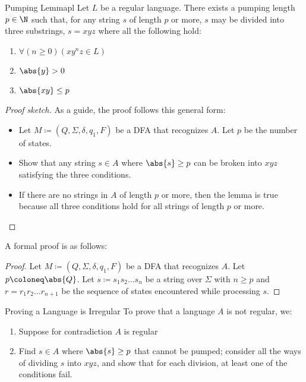 \documentclass[12pt]{report}
\begin{document}
\begin{thmbox}{Pumping Lemma}{pl}
    Let $L$ be a regular language. There exists a pumping length $p \in \N$ such that, for any string $s$ of length $p$ or more, $s$ may be divided into three substrings, $s = x y z$ where all the following hold:
    \begin{enumerate}[noitemsep]
        \item $\forall (n \geq 0) \left( x y^n z \in L \right)$
        \item $\abs{y} > 0$
        \item $\abs{x y} \leq p$
    \end{enumerate}
    \tcblower
    \begin{proof}[Proof sketch]
        As a guide, the proof follows this general form:
        \begin{itemize}[noitemsep]
            \item Let $M \coloneq (Q, \Sigma, \delta, q_1, F)$ be a DFA that recognizes $A$. Let $p$ be the number of states.
            \item Show that any string $s \in A$ where $\abs{s} \geq p$ can be broken into $xyz$ satisfying the three conditions.
            \item If there are no strings in $A$ of length $p$ or more, then the lemma is true because all three conditions hold for all strings of length $p$ or more.
        \end{itemize}
    \end{proof}

    A formal proof is as follows:
    \begin{proof}
        Let $M \coloneq  (Q, \Sigma, \delta, q_1, F)$ be a DFA that recognizes $A$. Let $p \coloneq \abs{Q}$. Let $s \coloneq s_1 s_2 \ldots s_n$ be a string over $\Sigma$ with $n \geq p$ and $r = r_1 r_2 \ldots r_{n+1}$ be the sequence of states encountered while processing $s$.
    \end{proof}
\end{thmbox}

\begin{tecbox}{Proving a Language is Irregular}{}
    To prove that a language $A$ is not regular, we:
    \begin{enumerate}
        \item Suppose for contradiction $A$ is regular
        \item Find $s \in A$ where $\abs{s} \geq p$ that cannot be pumped; consider all the ways of dividing $s$ into $xyz$, and show that for each division, at least one of the conditions fail.
    \end{enumerate}
\end{tecbox}
\end{document}
